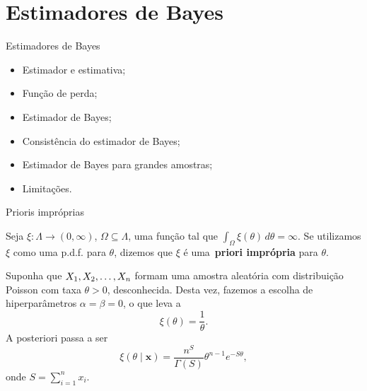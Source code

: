 \section*{Estimadores de Bayes}
\begin{frame}{Estimadores de Bayes}
 \begin{itemize}
  \item  Estimador e estimativa;
  \item Função de perda;
  \item Estimador de Bayes;
  \item Consistência do estimador de Bayes;
  \item Estimador de Bayes para grandes amostras;
  \item Limitações.
 \end{itemize}
\end{frame}


\begin{frame}{Prioris impróprias}
 \begin{defn}
 Seja $\xi : \Lambda \to (0, \infty)$, $\Omega \subseteq \Lambda$, uma função tal que $\int_{\Omega} \xi(\theta)\,d\theta = \infty$.
 Se utilizamos $\xi$ como uma p.d.f. para $\theta$, dizemos que $\xi$ é uma~\textbf{priori imprópria} para $\theta$.
 \end{defn}
\begin{exemplo}
   Suponha que $X_1, X_2, \ldots, X_n$ formam uma amostra aleatória com distribuição Poisson com taxa $\theta > 0$, desconhecida.
   Desta vez, fazemos a escolha de hiperparâmetros $\alpha = \beta = 0$, o que leva a 
   \begin{equation*}
    \xi(\theta) = \frac{1}{\theta}.
   \end{equation*}
A posteriori passa a ser 
  \begin{equation*}
   \xi(\theta \mid \boldsymbol{x}) = \frac{ n^{S} }{\Gamma(S)} \theta^{n-1} e^{-S\theta},
  \end{equation*}
   onde $S = \sum_{i=1}^n x_i$.
\end{exemplo}
\end{frame}

